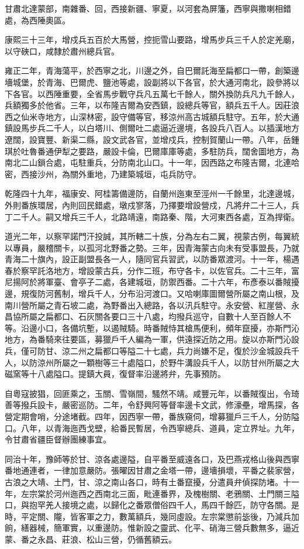 \begin{pinyinscope}
甘肅北達蒙部，南雜番、回，西接新疆、寧夏，以河套為屏籓，西寧與撒喇相錯處，為西陲奧區。

康熙三十三年，增戍兵五百於大馬營，控扼雪山要路，增馬步兵三千人於定羌廟，以守硤口，咸隸於肅州總兵官。

雍正二年，青海蕩平，於西寧之北，川邊之外，自巴爾託海至扁都口一帶，創築邊墻城堡，於青海、巴爾虎、鹽池等處，設副將以下各官，於大通河南北，設參將以下各官。以西陲重要，全省馬步戰守兵凡五萬七千餘人，關外換防兵凡九千餘人，兵額獨多於他省。三年，以布隆吉爾為安西鎮，設總兵等官，額兵五千人。因莊浪西之仙米寺地方，山深林密，設守備等官，移涼州高古城額兵駐守。五年，於大通鎮設馬步兵二千人，以白塔川、側爾吐二處逼近邊境，各設兵八百人。以插漢地方遼闊，設寶豐、新渠二縣，設文武各官，並增戍兵，控制賀蘭山一帶。八年，岳鍾琪於吐魯番通伊犁之要路，嚴設卡倫，巴爾庫庫等處，多駐防兵，闊舍圖地方，為南北二山鎖合處，屯駐重兵，分防南北山口。十一年，因西路之布隆吉爾，北連哈密，西接沙州，為關外重地，乃建築城垣，屯兵防守。

乾隆四十九年，福康安、阿桂籌備邊防，自蘭州迤東至涇州一千餘里，北達邊城，外則番族環居，內則回民錯處，墩戍寥落，乃擇要增設營戍，凡將弁二十三人，兵丁二千人。嗣又增兵三千人，北路靖遠，南路秦、階，大河東西各處，互為捍衛。

道光二年，以察罕諾門汗投誠，其所轄二十族，分為左右二翼，視蒙古例，每翼統以專員，嚴稽關卡，以孤河北野番之勢。三年，因青海蒙古向未有受事盟長，乃就青海二十旗內，設正副盟長各一人，隨同官兵習武，以防番眾渡河。十一年，楊遇春於察罕託洛地方，增設蒙古兵，分作二班，布守各卡，以佐官兵。二十三年，富尼揚阿於將軍臺、會亭子二處，各建城垣，防禦西番。二十六年，布彥泰以番賊擾邊，規復防河舊制，增兵千人，分布沿河渡口。又哈喇庫圖爾營所屬之南山根，及南川營所屬之青石坡二處，為野番出入總路，各以汛兵駐守。永安營、紅崖營、永昌協所屬之扁都口、石灰關各要口三十八處，均撥兵巡守，自數十人至百餘人不等。沿邊小口，各備坑塹，以遏賊騎。時番賊恃其槍馬便利，頻年竄擾，亦斯門沁地方，為番騎來往要區，募獵戶千人編為一軍，供遠探近防之用。旋以亦斯門沁設兵，僅可防甘、涼二州之扁都口等隘二十七處，兵力尚嫌不足，復於沙金城設兵千人，以防涼州所屬之一顆樹等三十處隘口，於野牛溝設兵千人，以防甘州所屬之大磁窯等十八處隘口。提鎮大員，復督率沿邊將弁，先事預防。

自粵寇披猖，回匪乘之，玉關、雪嶺間，騷然不靖。咸豐元年，以番賊復出，令琦善等撥兵設卡，嚴密巡防。二年，令舒興阿等督率邊卡文武，修濠壘，增馬探，各營定期會哨，分途堵截。四年，因西寧一帶，番族窺伺，增募獵戶三千人，分防隘口。八年，以青海迤西戈壁，給番民暫居，令西寧總兵、道員，定立界址。九年，令甘肅省疆臣督辦團練事宜。

同治十年，豫師等於甘、涼各處邊隘，自平番至威遠各口，及巴燕戎格山後與西寧番地通連者，一律加意嚴防。張曜因甘肅之金塔一帶，邊墻損壞，平番之裴家營，古浪之大靖、土門，甘、涼之南山各口，時有土番竄擾，分遣員弁偵探防堵。十一年，左宗棠於河州迤西之西南北三面，毗連番界，及槐樹關、老鴉關、土門關三隘口，與抱罕羌人接境之處，以歸化之番眾僧俗四千人，馬四千餘匹，防守各關。是時，平定關、隴，皆客軍之力，數萬額兵，幾同虛設。左宗棠懲前毖後，乃減兵加餉，繕器械，簡軍實，以重邊防。惟新設之靈武、化平、硝海三營兵數無多，逼近蒙、番之永昌、莊浪、松山三營，仍循舊額云。


\end{pinyinscope}
